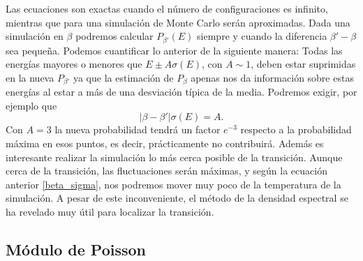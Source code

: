 Las ecuaciones son exactas cuando el número de configuraciones es infinito,
mientras que para una simulación de Monte Carlo serán aproximadas. Dada una
simulación en $\beta$ podremos calcular $P_{\beta'}(E)$ siempre y cuando la
diferencia $\beta'-\beta$ sea pequeña. Podemos cuantificar lo anterior de la
siguiente manera: Todas las energías mayores o menores que $E\pm A \sigma(E)$,
con $A\sim 1$, deben estar suprimidas en la nueva $P_{\beta'}$ ya que la
estimación de $P_{\beta}$ apenas nos da información sobre estas energías al
estar a más de una desviación típica de la media. Podremos exigir, por ejemplo
que  
\begin{equation}\label{beta_sigma}
|\beta-\beta'|\sigma(E)=A.
\end{equation}
Con $A=3$ la nueva probabilidad tendrá un factor $e^{-3}$ respecto a la
probabilidad máxima en esos puntos, es decir, prácticamente no contribuirá.
Además es interesante realizar la simulación lo más cerca posible de la
transición. Aunque cerca de la transición, las fluctuaciones serán máximas, y según
 la ecuación anterior \eqref{beta_sigma}, nos podremos mover muy poco de la
 temperatura de la simulación. A pesar de este inconveniente, el método de la
 densidad espectral se ha revelado muy útil para localizar la transición.

\subsection{Módulo de Poisson}

